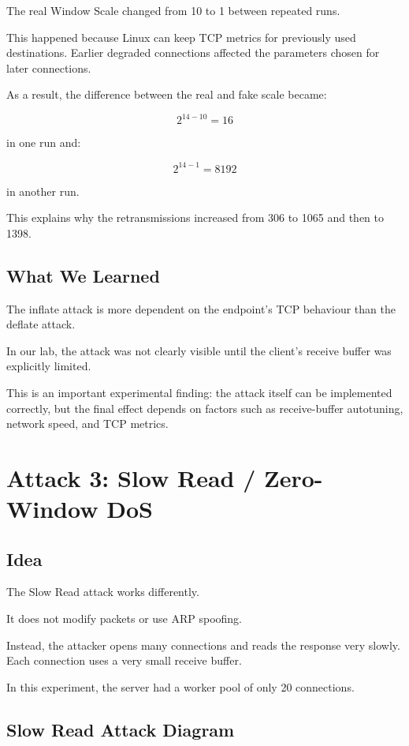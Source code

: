 \documentclass[11pt]{article}
\begin{document}
The real Window Scale changed from 10 to 1 between repeated runs.

This happened because Linux can keep TCP metrics for previously used
destinations. Earlier degraded connections affected the parameters
chosen for later connections.

As a result, the difference between the real and fake scale became:

\[
2^{14-10}=16
\]

in one run and:

\[
2^{14-1}=8192
\]

in another run.

This explains why the retransmissions increased from 306 to 1065
and then to 1398.

\subsection{What We Learned}

The inflate attack is more dependent on the endpoint's TCP behaviour
than the deflate attack.

In our lab, the attack was not clearly visible until the client's
receive buffer was explicitly limited.

This is an important experimental finding: the attack itself can be
implemented correctly, but the final effect depends on factors such
as receive-buffer autotuning, network speed, and TCP metrics.

\section{Attack 3: Slow Read / Zero-Window DoS}

\subsection{Idea}

The Slow Read attack works differently.

It does not modify packets or use ARP spoofing.

Instead, the attacker opens many connections and reads the response
very slowly. Each connection uses a very small receive buffer.

In this experiment, the server had a worker pool of only 20
connections.

\subsection{Slow Read Attack Diagram}
\end{document}
